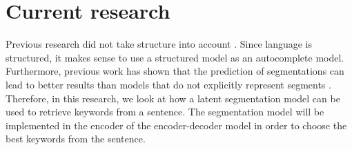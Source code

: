 
\section{Current research}

Previous research did not take structure into account .
Since language is structured, it makes sense to use a structured model as an autocomplete model. 
Furthermore, previous work has shown that the prediction of segmentations can lead to better results than models that do not explicitly represent segments . 
Therefore, in this research, we look at how a latent segmentation model can be used to retrieve keywords from a sentence. 
The segmentation model will be implemented in the encoder of the encoder-decoder model in order to choose the best keywords from the sentence.